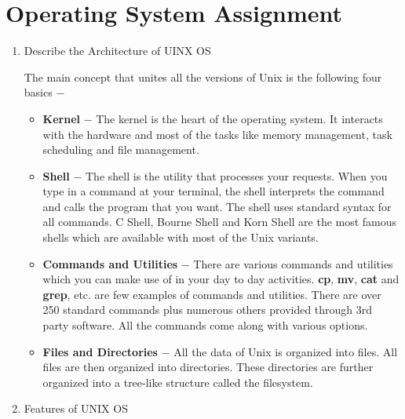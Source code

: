 \documentclass{article}
\newenvironment{problem}{\begin{enumerate}[label=\bfseries\alph*.]\large\bfseries}{\end{enumerate}}
\newenvironment{answered}{\par\normalfont}{}
\begin{document}



\section{Operating System Assignment}

\noindent
\begin{problem}
   \item Describe the Architecture of UINX OS
         \begin{answered}
            The main concept that unites all the versions of Unix is the following four basics −
            \begin{itemize}
                \item \textbf{Kernel} − The kernel is the heart of the operating system. It interacts with the hardware and most of the tasks like memory management, task scheduling and file management.
                
                \item \textbf{Shell} − The shell is the utility that processes your requests. When you type in a command at your terminal, the shell interprets the command and calls the program that you want. The shell uses standard syntax for all commands. C Shell, Bourne Shell and Korn Shell are the most famous shells which are available with most of the Unix variants.
                
                \item \textbf{Commands and Utilities} − There are various commands and utilities which you can make use of in your day to day activities. \textbf{cp}, \textbf{mv}, \textbf{cat} and \textbf{grep}, etc. are few examples of commands and utilities. There are over 250 standard commands plus numerous others provided through 3rd party software. All the commands come along with various options.
                
                \item \textbf{Files and Directories} − All the data of Unix is organized into files. All files are then organized into directories. These directories are further organized into a tree-like structure called the filesystem.
            \end{itemize}
         \end{answered}

   \item Features of UNIX OS
         \begin{answered}


\end{answered}
\end{problem}
\end{document}

